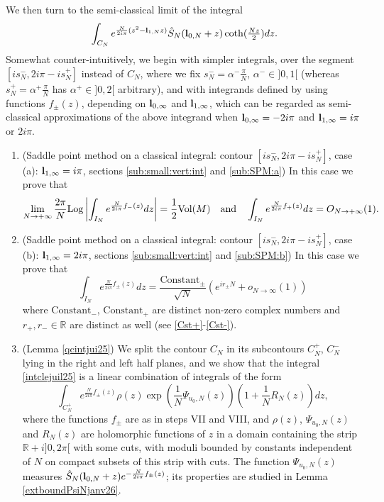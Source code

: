 \documentclass[11pt]{amsart}
\newcommand{\mr}{\mathbb{R}}
\newcommand{\R}{\mathbb{R}}
\newcommand{\bl}{{\bf l}}
\newcommand{\Log}{{\rm Log}}
\begin{document}
We then turn to the semi-classical limit of the integral
\begin{equation}\label{intclejuil25}\int_{C_N} e^{\frac{N}{2i\pi}(z^2 - \bl_{1,N}z)}\hat S_N(\bl_{0,N} + z)\textstyle \coth(\frac{Nz}{2})dz .
\end{equation}
Somewhat counter-intuitively, we begin with simpler integrals, over the segment $[is_N^-,2i\pi-is_N^+]$ instead of $C_N$, where we fix $\textstyle s_N^-=\alpha^-\frac{\pi}{N}$, $\alpha^-\in ]0,1[$ (whereas $\textstyle s_N^+=\alpha^+\frac{\pi}{N}$ has $\alpha^+\in ]0,2[$ arbitrary), and with integrands defined by using functions $f_{\pm}(z)$, depending on $\bl_{0,\infty}$ and $\bl_{1,\infty}$, which can be regarded as semi-classical approximations of the above integrand when $\bl_{0,\infty}=-2i\pi$ and $\bl_{1,\infty} = i\pi$ or $2i\pi$. 
\begin{enumerate}
\item[VII)] (Saddle point method on a classical integral: contour $[is_N^-,2i\pi-is_N^+]$, case (a): $\bl_{1,\infty} = i\pi$, sections \ref{sub:small:vert:int} and \ref{sub:SPM:a}) In this case we prove that
$$\lim_{N\rightarrow +\infty} \dfrac{2\pi}{N}\Log \left \vert \int_{I_N} e^{\frac{N}{2i\pi} f_{-}(z)}dz \right \vert  = \frac{1}{2}{\rm Vol}(M)\ \ \ {\rm and}\ \ \ \int_{I_N} e^{\frac{N}{2i\pi} f_{+}(z)}dz = O_{N\rightarrow +\infty}(1).$$
\item[VIII)] (Saddle point method on a classical integral: contour $[is_N^-,2i\pi-is_N^+]$,  case (b): $\bl_{1,\infty} = 2i\pi$, sections \ref{sub:small:vert:int} and \ref{sub:SPM:b}) In this case we prove that
$$\int_{I_N} e^{\frac{N}{2i\pi} f_{\pm}(z)}dz  = \dfrac{\text{Constant}_\pm}{\sqrt{N}}(e^{i r_\pm N}+o_{N\to\infty}(1))$$
where $\text{Constant}_-$, $\text{Constant}_+$ are distinct non-zero complex numbers and $r_+,r_-\in \R$ are distinct as well (see \eqref{Cst+}-\eqref{Cst-}).
\smallskip

\item[IX)]  (Lemma \ref{qcintjui25}) We split the contour $C_N$ in its subcontours $C_N^+$, $C_N^-$ lying in the right and left half planes, and we show that the integral \eqref{intclejuil25} is a linear combination of integrals of the form  
$$\int_{C_N^+} e^{\frac{N}{2i\pi} f_{\pm}(z)}\rho(z)\exp\left(\frac{1}{N}{\Psi_{u_0,N}(z)}\right)\left(1+\frac{1}{N}R_N(z)\right) dz,$$
where the functions $f_\pm$ are as in steps VII and VIII, and $\rho(z)$, $\Psi_{u_0,N}(z)$ and $R_N(z)$ are holomorphic functions of $z$ in a domain containing the strip $\mr + i]0,2\pi[$ with some cuts, with moduli bounded by constants independent of $N$ on compact subsets of this strip with cuts. The function $\Psi_{u_0,N}(z)$ measures $\hat S_N(\bl_{0,N} + z)e^{-\frac{N}{2i\pi} f_{\pm}(z)}$; its properties are studied in Lemma \ref{extboundPsiNjanv26}. 


\end{enumerate}
\end{document}
